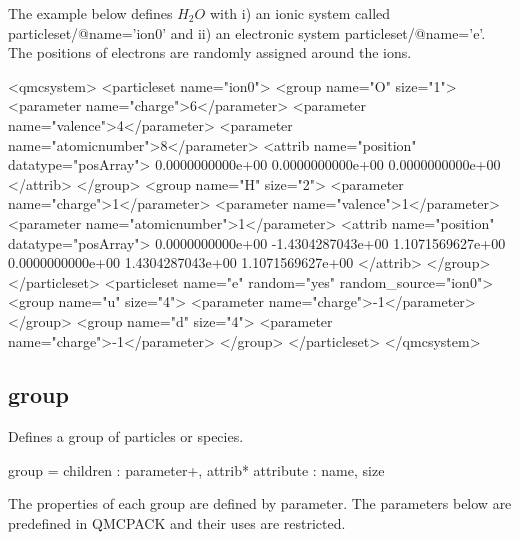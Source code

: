 The example below defines $H_2O$ with i) an ionic system called {\ttfamily particleset/@name='ion0'} and ii) an electronic system {\ttfamily particleset/@name='e'}. The positions of electrons are randomly assigned around the ions.


\begin{DoxyCode}
<qmcsystem>
  <particleset name=\textcolor{stringliteral}{"ion0"}>
    <group name=\textcolor{stringliteral}{"O"} size=\textcolor{stringliteral}{"1"}>
      <parameter name=\textcolor{stringliteral}{"charge"}>6</parameter>
      <parameter name=\textcolor{stringliteral}{"valence"}>4</parameter>
      <parameter name=\textcolor{stringliteral}{"atomicnumber"}>8</parameter>
      <attrib name=\textcolor{stringliteral}{"position"} datatype=\textcolor{stringliteral}{"posArray"}>
      0.0000000000e+00  0.0000000000e+00  0.0000000000e+00
      </attrib>
    </group>
    <group name=\textcolor{stringliteral}{"H"} size=\textcolor{stringliteral}{"2"}>
      <parameter name=\textcolor{stringliteral}{"charge"}>1</parameter>
      <parameter name=\textcolor{stringliteral}{"valence"}>1</parameter>
      <parameter name=\textcolor{stringliteral}{"atomicnumber"}>1</parameter>
      <attrib name=\textcolor{stringliteral}{"position"} datatype=\textcolor{stringliteral}{"posArray"}>
      0.0000000000e+00 -1.4304287043e+00  1.1071569627e+00
      0.0000000000e+00  1.4304287043e+00  1.1071569627e+00
      </attrib>
    </group>
  </particleset>
  <particleset name=\textcolor{stringliteral}{"e"} random=\textcolor{stringliteral}{"yes"} random\_source=\textcolor{stringliteral}{"ion0"}>
    <group name=\textcolor{stringliteral}{"u"} size=\textcolor{stringliteral}{"4"}>
      <parameter name=\textcolor{stringliteral}{"charge"}>-1</parameter>
    </group>
    <group name=\textcolor{stringliteral}{"d"} size=\textcolor{stringliteral}{"4"}>
      <parameter name=\textcolor{stringliteral}{"charge"}>-1</parameter>
    </group>
  </particleset>
</qmcsystem>
\end{DoxyCode}
\subsection{group}\label{a00004_groupX}
Defines a group of particles or species. 
\begin{DoxyCode}
group =
  children  : parameter+, attrib*
  attribute : name, size
\end{DoxyCode}


The properties of each group are defined by {\ttfamily parameter}. The parameters below are predefined in Q\-M\-C\-P\-A\-C\-K and their uses are restricted.

